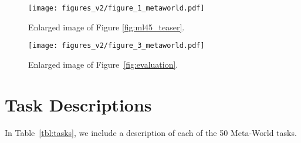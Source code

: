 \begin{sidewaysfigure}
    \texttt{[image: figures\_v2/figure\_1\_metaworld.pdf]}
    \caption{Enlarged image of Figure \ref{fig:ml45_teaser}.}
    \label{app:ML45_figure}
\end{sidewaysfigure}
\clearpage
\begin{sidewaysfigure}[p]
    \texttt{[image: figures\_v2/figure\_3\_metaworld.pdf]}
    \caption{\footnotesize Enlarged image of Figure~\ref{fig:evaluation}.
    }
\end{sidewaysfigure}
\clearpage

\section{Task Descriptions}
\label{app:tasks}

In Table~\ref{tbl:tasks}, we include a description of each of the 50 Meta-World tasks.


